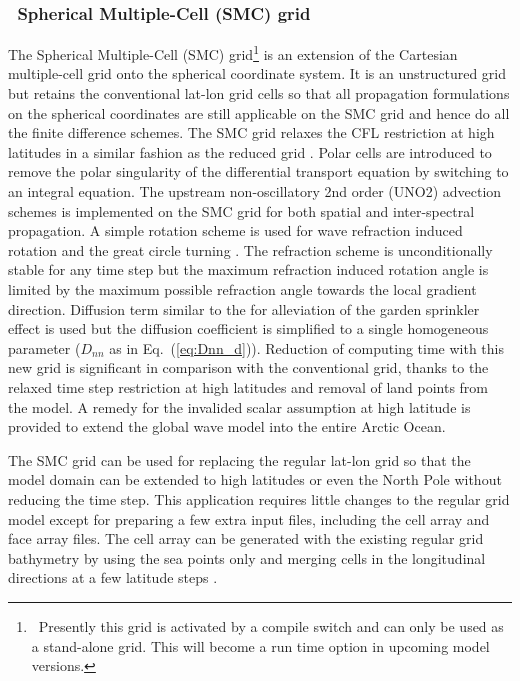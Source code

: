 \vssub
\subsubsection{~Spherical Multiple-Cell (SMC) grid} \label{sub:num_space_SMC}

\noindent
The Spherical Multiple-Cell (SMC) grid\footnote{~Presently this grid is
activated by a compile switch and can only be used as a stand-alone grid. This
will become a run time option in upcoming model versions.}  \citep{art:Li11}
is an extension of the Cartesian multiple-cell grid \citep{art:Li03} onto the
spherical coordinate system. It is an unstructured grid but retains the
conventional lat-lon grid cells so that all propagation formulations on the
spherical coordinates are still applicable on the SMC grid and hence do all
the finite difference schemes. The SMC grid relaxes the CFL restriction at
high latitudes in a similar fashion as the reduced grid
\citep{art:RA94}. Polar cells are introduced to remove the polar singularity
of the differential transport equation by switching to an integral
equation. The upstream non-oscillatory 2nd order (UNO2) advection schemes
\citep{art:Li08} is implemented on the SMC grid for both spatial and
inter-spectral propagation. A simple rotation scheme is used for wave refraction 
induced rotation and the great circle turning \citep{art:Li12}.  The refraction
scheme is unconditionally stable for any time step but the maximum refraction 
induced rotation angle is limited by the maximum possible refraction angle 
towards the local gradient direction.  Diffusion term similar to the 
\cite{art:BH87} for alleviation of the garden sprinkler effect is used but
the diffusion coefficient is simplified to a single homogeneous parameter
($D_{nn}$ as in Eq.~(\ref{eq:Dnn_d})).  Reduction of computing time with this
new grid is significant in comparison with the conventional grid, thanks to
the relaxed time step restriction at high latitudes and removal of land points
from the model. A remedy for the invalided scalar assumption at high latitude
is provided to extend the global wave model into the entire Arctic Ocean.

The SMC grid can be used for replacing the regular lat-lon grid so that the
model domain can be extended to high latitudes or even the North Pole without
reducing the time step. This application requires little changes to the
regular grid model except for preparing a few extra input files, including the
cell array and face array files. The cell array can be generated with the
existing regular grid bathymetry by using the sea points only and merging
cells in the longitudinal directions at a few latitude steps \citep{art:Li11}.

